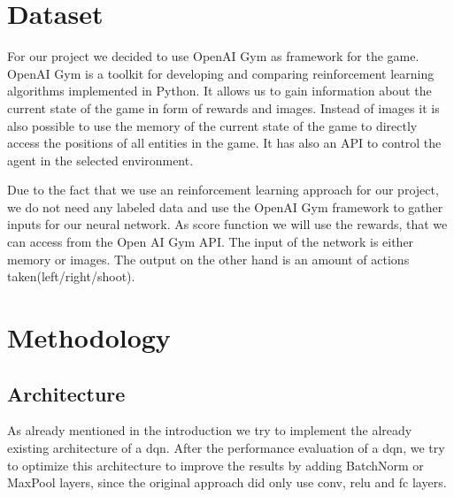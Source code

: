 \documentclass[10pt,twocolumn,letterpaper]{article}
\begin{document}
\section{Dataset}
For our project we decided to use OpenAI Gym as framework for the game. OpenAI Gym is a toolkit for developing and comparing reinforcement learning algorithms implemented in Python. It allows us to gain information about the current state of the game in form of rewards and images. Instead of images it is also possible to use the memory of the current state of the game to directly access the positions of all entities in the game. It has also an API to control the agent in the selected environment.
	
Due to the fact that we use an reinforcement learning approach for our project, we do not need any labeled data and use the OpenAI Gym framework to gather inputs for our neural network. As score function we will use the rewards, that we can access from the Open AI Gym API. The input of the network is either memory or images. The output on the other hand is an amount of actions taken(left/right/shoot).


\section{Methodology}
\subsection{Architecture}
As already mentioned in the introduction we try to implement the already existing architecture of a \gls{dqn}. After the performance evaluation of a \gls{dqn}, we try to optimize this architecture to improve the results by adding BatchNorm or MaxPool layers, since the original approach did only use conv, relu and fc layers.
\end{document}
